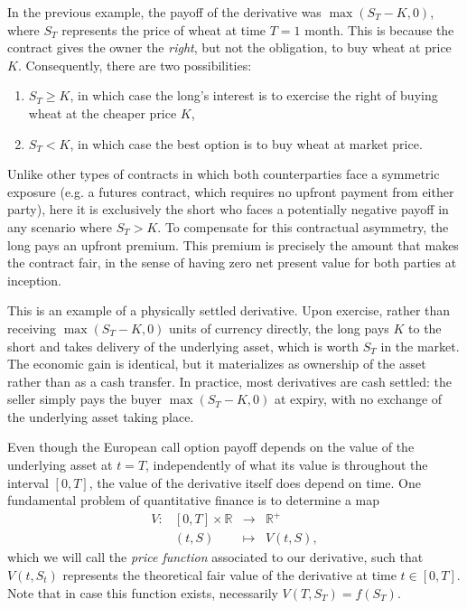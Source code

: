 \documentclass{article}
\def\R{\mathbb{R}}
\renewcommand{\to}{\longrightarrow}
\theoremstyle{definition}
\theoremstyle{remark}
\begin{document}
In the previous example, the payoff of the derivative was $\max(S_T-K,0)$, where $S_T$ represents the price of wheat at time $T=1$ month. This is because the contract gives the owner the \textit{right}, but not the obligation, to buy wheat at price $K$. Consequently, there are two possibilities: \begin{enumerate}[label=(\roman*)]
    \item $S_T \geq K$, in which case the long's interest is to exercise the right of buying wheat at the cheaper price $K$,
    \item $S_T < K$, in which case the best option is to buy wheat at market price.
\end{enumerate}
Unlike other types of contracts in which both counterparties face a symmetric exposure (e.g. a futures contract, which requires no upfront payment from either party), here it is exclusively the short who faces a potentially negative payoff in any scenario where $S_T>K$. To compensate for this contractual asymmetry, the long pays an upfront premium. This premium is precisely the amount that makes the contract fair, in the sense of having zero net present value for both parties at inception.

This is an example of a physically settled derivative. Upon exercise, rather than receiving $\max(S_T - K, 0)$ units of currency directly, the long pays $K$ to the short and takes delivery of the underlying asset, which is worth $S_T$ in the market. The economic gain is identical, but it materializes as ownership of the asset rather than as a cash transfer. In practice, most derivatives are cash settled: the seller simply pays the buyer $\max(S_T - K, 0)$ at expiry, with no exchange of the underlying asset taking place.


Even though the European call option payoff depends on the value of the underlying asset at $t=T$, independently of what its value is throughout the interval $[0,T]$, the value of the derivative itself does depend on time. One fundamental problem of quantitative finance is to determine a map \[
\begin{array}{rrcl}
    V:&[0,T]\times\R&\to &\R^+\\
    & (t,S) &\longmapsto & V(t,S),
\end{array}
\]which we will call the \textit{price function} associated to our derivative, such that $V(t,S_t)$ represents the theoretical fair value of the derivative at time $t\in[0,T]$. Note that in case this function exists, necessarily $V(T,S_T)=f(S_T)$.
\end{document}
